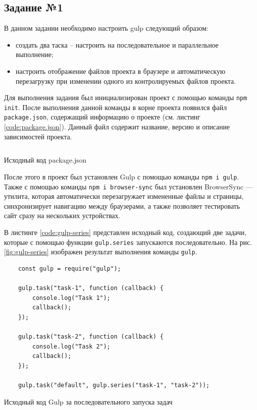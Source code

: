 \documentclass[a4paper, 14pt]{extarticle}
\newenvironment{code}{\captionsetup{type=listing}}{}
\begin{document}
\subsection*{Задание №1}

В данном задании необходимо настроить gulp следующий образом:
\begin{itemize}
  \item создать два таска – настроить на последовательное и параллельное
  выполнение;
  \item настроить отображение файлов проекта в браузере и автоматическую
  перезагрузку при изменении одного из контролируемых файлов проекта.
\end{itemize}

Для выполнения задания был инициализирован проект с помощью команды \texttt{npm
  init}. После выполнения данной команды в корне проекта появился файл
\texttt{package.json}, содержащий информацию о проекте (см. листинг
\ref{code:package.json}). Данный файл содержит название, версию и описание
зависимостей проекта.

\begin{code}
  \inputminted{json}{../task-1/package.json}
  \caption{Исходный код package.json}
  \label{code:package.json}
\end{code}

После этого в проект был установлен Gulp с помощью команды \texttt{npm i gulp}.
Также с помощью команды \texttt{npm i browser-sync} был установлен BrowserSync —
утилита, которая автоматически перезагружает измененные файлы и страницы,
синхронизирует навигацию между браузерами, а также позволяет тестировать сайт
сразу на нескольких устройствах.

В листинге \ref{code:gulp-series} представлен исходный код, создающий две
задачи, которые с помощью функции \texttt{gulp.series} запускаются
последовательно. На рис. \ref{fig:gulp-series} изображен результат выполнения
команды \texttt{gulp}.

\begin{code}
  \begin{verbatim}
    const gulp = require("gulp");

    gulp.task("task-1", function (callback) {
        console.log("Task 1");
        callback();
    });

    gulp.task("task-2", function (callback) {
        console.log("Task 2");
        callback();
    });

    gulp.task("default", gulp.series("task-1", "task-2"));
  \end{verbatim}
  \caption{Исходный код Gulp за последовательного запуска задач}
  \label{code:gulp-series}
\end{code}
\end{document}
